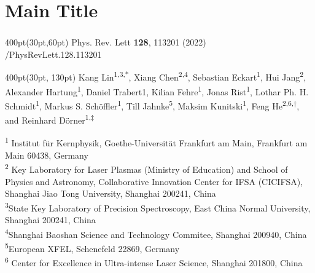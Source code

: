 \section{Main Title}
\begin{frame}
\frametitle{}
\framesubtitle{}

\small
\begin{textblock*}{400pt}(30pt,60pt)
Phys. Rev. Lett \textbf{128}, 113201 (2022) \\
/PhysRevLett.128.113201
\end{textblock*}

\begin{textblock*}{400pt}(30pt, 130pt)
\centering\footnotesize
Kang Lin\textsuperscript{1,3,*},
Xiang Chen\textsuperscript{2,4},
Sebastian Eckart\textsuperscript{1},
Hui Jang\textsuperscript{2},
Alexander Hartung\textsuperscript{1},
Daniel Trabert{1},
Kilian Fehre\textsuperscript{1},
Jonas Rist\textsuperscript{1},
Lothar Ph. H. Schmidt\textsuperscript{1},
Markus S. Sch\"offler\textsuperscript{1},
Till Jahnke\textsuperscript{5},
Maksim Kunitski\textsuperscript{1},
Feng He\textsuperscript{2,6,$\dagger$},
and Reinhard D\"orner\textsuperscript{1,$\ddagger$}

\vspace{10pt}
\tiny
\textsuperscript{1} Institut f\"ur Kernphysik, 
Goethe-Universit\"at Frankfurt am Main,
Frankfurt am Main 60438, Germany \\
\textsuperscript{2} Key Laboratory for Laser Plasmas 
(Ministry of Education) and School of Physics and Astronomy, 
Collaborative Innovation Center for IFSA (CICIFSA), 
Shanghai Jiao Tong University, Shanghai 200241, China \\
\textsuperscript{3}State Key Laboratory of Precision Spectroscopy, 
East China Normal University, Shanghai 200241, China \\
\textsuperscript{4}Shanghai Baoshan Science and Technology Commitee, 
Shanghai 200940, China \\
\textsuperscript{5}European XFEL, Schenefeld 22869, Germany \\
\textsuperscript{6} Center for Excellence in Ultra-intense Laser Science, 
Shanghai 201800, China


\end{textblock*}


\end{frame}
